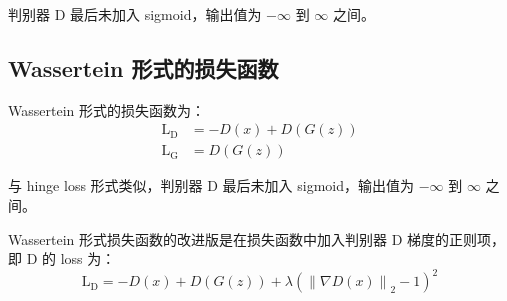 判别器 D 最后未加入 sigmoid，输出值为 $-\infty$ 到 $\infty$ 之间。

\subsection{Wassertein 形式的损失函数}
Wassertein 形式的损失函数为：
\begin{align}
  \label{equ:WGAN-loss}
  \mathrm{L}_{\mathrm{D}} & = -D(x) + D(G(z)) \\
  \mathrm{L}_{\mathrm{G}} & = D(G(z))
\end{align}

与 hinge loss 形式类似，判别器 D 最后未加入 sigmoid，输出值为 $-\infty$ 到 $\infty$ 之间。

Wassertein 形式损失函数的改进版是在损失函数中加入判别器 D 梯度的正则项，
即 D 的 loss 为：
\begin{equation}
  \label{equ:WGAN-GP-loss}
  \mathrm{L}_{\mathrm{D}} = -D(x) + D(G(z)) + \lambda \left( \left\| \nabla D(x) \right\|_2 - 1 \right ) ^ 2
\end{equation}

